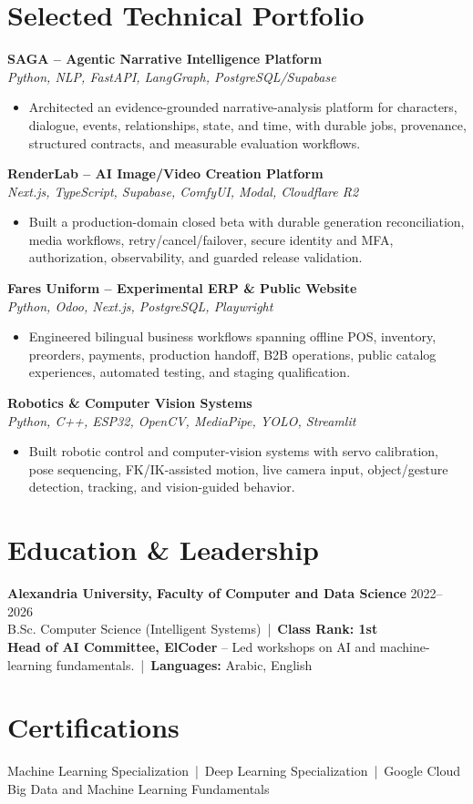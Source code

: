 \documentclass[letterpaper]{article}
\newcommand{\projectheader}[2]{\textbf{#1} \\\textit{#2} \\}
\begin{document}
\section*{Selected Technical Portfolio}
\projectheader{SAGA -- Agentic Narrative Intelligence Platform}{Python, NLP, FastAPI, LangGraph, PostgreSQL/Supabase}
\begin{itemize}
\item Architected an evidence-grounded narrative-analysis platform for characters, dialogue, events, relationships, state, and time, with durable jobs, provenance, structured contracts, and measurable evaluation workflows.
\end{itemize}
\projectheader{RenderLab -- AI Image/Video Creation Platform}{Next.js, TypeScript, Supabase, ComfyUI, Modal, Cloudflare R2}
\begin{itemize}
\item Built a production-domain closed beta with durable generation reconciliation, media workflows, retry/cancel/failover, secure identity and MFA, authorization, observability, and guarded release validation.
\end{itemize}
\projectheader{Fares Uniform -- Experimental ERP \& Public Website}{Python, Odoo, Next.js, PostgreSQL, Playwright}
\begin{itemize}
\item Engineered bilingual business workflows spanning offline POS, inventory, preorders, payments, production handoff, B2B operations, public catalog experiences, automated testing, and staging qualification.
\end{itemize}
\projectheader{Robotics \& Computer Vision Systems}{Python, C++, ESP32, OpenCV, MediaPipe, YOLO, Streamlit}
\begin{itemize}
\item Built robotic control and computer-vision systems with servo calibration, pose sequencing, FK/IK-assisted motion, live camera input, object/gesture detection, tracking, and vision-guided behavior.
\end{itemize}

\section*{Education \& Leadership}
\textbf{Alexandria University, Faculty of Computer and Data Science} \hfill 2022--2026\\
B.Sc. Computer Science (Intelligent Systems) \,|\, \textbf{Class Rank: 1st}\\
\textbf{Head of AI Committee, ElCoder} -- Led workshops on AI and machine-learning fundamentals. \,|\, \textbf{Languages:} Arabic, English

\section*{Certifications}
Machine Learning Specialization \,|\, Deep Learning Specialization \,|\, Google Cloud Big Data and Machine Learning Fundamentals
\end{document}
